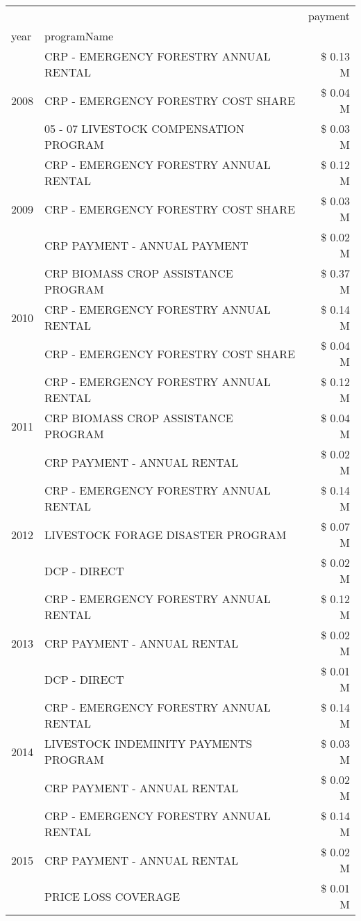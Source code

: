 \begin{tabular}{llr}
\toprule
 &  & payment \\
year & programName &  \\
\midrule
\multirow[t]{3}{*}{2008} & CRP - EMERGENCY FORESTRY ANNUAL RENTAL & \$ 0.13 M \\
 & CRP - EMERGENCY FORESTRY COST SHARE & \$ 0.04 M \\
 & 05 - 07 LIVESTOCK COMPENSATION PROGRAM & \$ 0.03 M \\
\cline{1-3}
\multirow[t]{3}{*}{2009} & CRP - EMERGENCY FORESTRY ANNUAL RENTAL & \$ 0.12 M \\
 & CRP - EMERGENCY FORESTRY COST SHARE & \$ 0.03 M \\
 & CRP PAYMENT - ANNUAL PAYMENT & \$ 0.02 M \\
\cline{1-3}
\multirow[t]{3}{*}{2010} & CRP BIOMASS CROP ASSISTANCE PROGRAM & \$ 0.37 M \\
 & CRP - EMERGENCY FORESTRY ANNUAL RENTAL & \$ 0.14 M \\
 & CRP - EMERGENCY FORESTRY COST SHARE & \$ 0.04 M \\
\cline{1-3}
\multirow[t]{3}{*}{2011} & CRP - EMERGENCY FORESTRY ANNUAL RENTAL & \$ 0.12 M \\
 & CRP BIOMASS CROP ASSISTANCE PROGRAM & \$ 0.04 M \\
 & CRP PAYMENT - ANNUAL RENTAL & \$ 0.02 M \\
\cline{1-3}
\multirow[t]{3}{*}{2012} & CRP - EMERGENCY FORESTRY ANNUAL RENTAL & \$ 0.14 M \\
 & LIVESTOCK FORAGE DISASTER PROGRAM & \$ 0.07 M \\
 & DCP - DIRECT & \$ 0.02 M \\
\cline{1-3}
\multirow[t]{3}{*}{2013} & CRP - EMERGENCY FORESTRY ANNUAL RENTAL & \$ 0.12 M \\
 & CRP PAYMENT - ANNUAL RENTAL & \$ 0.02 M \\
 & DCP - DIRECT & \$ 0.01 M \\
\cline{1-3}
\multirow[t]{3}{*}{2014} & CRP - EMERGENCY FORESTRY ANNUAL RENTAL & \$ 0.14 M \\
 & LIVESTOCK INDEMINITY PAYMENTS PROGRAM & \$ 0.03 M \\
 & CRP PAYMENT - ANNUAL RENTAL & \$ 0.02 M \\
\cline{1-3}
\multirow[t]{3}{*}{2015} & CRP - EMERGENCY FORESTRY ANNUAL RENTAL & \$ 0.14 M \\
 & CRP PAYMENT - ANNUAL RENTAL & \$ 0.02 M \\
 & PRICE LOSS COVERAGE & \$ 0.01 M \\

\end{tabular}

